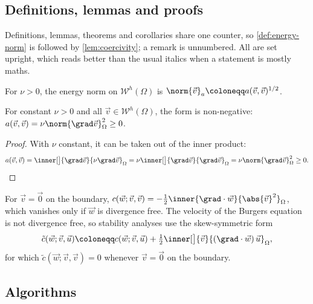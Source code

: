 \subsection{Definitions, lemmas and proofs}\label{sec:statements}

Definitions, lemmas, theorems and corollaries share one counter, so \cref{def:energy-norm} is followed by \cref{lem:coercivity}; a remark is unnumbered. All are set upright, which reads better than the usual italics when a statement is mostly maths.

\begin{definition}\label{def:energy-norm}
For $\nu > 0$, the energy norm on $\mathcal{W}^h(\Omega)$ is $\norm{\vec{v}}_a \coloneqq a(\vec{v}, \vec{v})^{1/2}$.
\end{definition}

\begin{lemma}[Coercivity]\label{lem:coercivity}
For constant $\nu > 0$ and all $\vec{v} \in \mathcal{W}^h(\Omega)$, the form is non-negative: $a(\vec{v}, \vec{v}) = \nu \norm{\grad\vec{v}}_\Omega^2 \geq 0$.
\end{lemma}

\begin{proof}
With $\nu$ constant, it can be taken out of the inner product:
\begin{equation*}
    a(\vec{v}, \vec{v}) = \inner[\big]{\grad\vec{v}}{\nu \grad\vec{v}}_\Omega = \nu \inner[\big]{\grad\vec{v}}{\grad\vec{v}}_\Omega = \nu \norm{\grad\vec{v}}_\Omega^2 \geq 0 . \qedhere
\end{equation*}
\end{proof}

\begin{remark}
For $\vec{v} = \vec{0}$ on the boundary, $c(\vec{w}; \vec{v}, \vec{v}) = -\tfrac{1}{2} \inner{\grad\cdot\vec{w}}{\abs{\vec{v}}^2}_\Omega$, which vanishes only if $\vec{w}$ is divergence free. The velocity of the Burgers equation is not divergence free, so stability analyses use the skew-symmetric form
\begin{equation*}
    \tilde{c}(\vec{w}; \vec{v}, \vec{u}) \coloneqq c(\vec{w}; \vec{v}, \vec{u}) + \tfrac{1}{2} \inner[\big]{\vec{v}}{(\grad\cdot\vec{w})\, \vec{u}}_\Omega ,
\end{equation*}
for which $\tilde{c}(\vec{w}; \vec{v}, \vec{v}) = 0$ whenever $\vec{v} = \vec{0}$ on the boundary.
\end{remark}

\subsection{Algorithms}\label{sec:algorithms}

